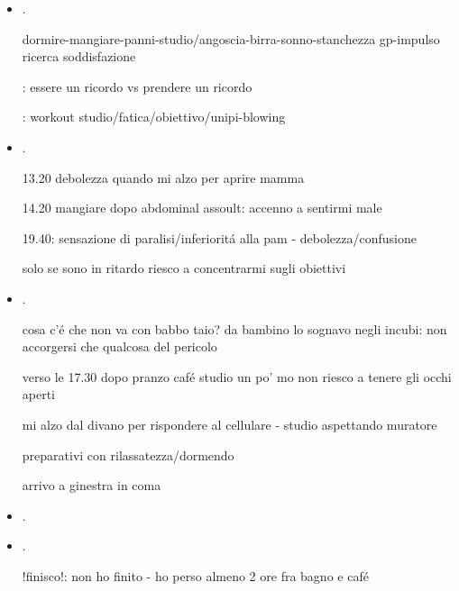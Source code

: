 \begin{itemize}
ansia di non addormentarsi

sono le 10, priorit\'a incosciente

mi manca nitidezza per distingure capitalit\'a da cosa

condizione post pisolino pomeriggio: non riesco a distinguere cosa mi conviene - 

cena: perdo di vista me-impulso non essere riconosciuto

\item {}.

dormire-mangiare-panni-studio/angoscia-birra-sonno-stanchezza gp-impulso ricerca soddisfazione

: essere un ricordo vs prendere un ricordo

: workout studio/fatica/obiettivo/unipi-blowing

\item {}.

13.20 debolezza quando mi alzo per aprire mamma

14.20 mangiare dopo abdominal assoult: accenno a sentirmi male

19.40: sensazione di paralisi/inferiorit\'a alla pam - debolezza/confusione

solo se sono in ritardo riesco a concentrarmi sugli obiettivi

\item {}.

cosa c'\'e che non va con babbo taio? da bambino lo sognavo negli incubi: non accorgersi che qualcosa del pericolo

verso le 17.30 dopo pranzo caf\'e studio un po' mo non riesco a tenere gli occhi aperti

mi alzo dal divano per rispondere al cellulare - studio aspettando muratore

preparativi con rilassatezza/dormendo

arrivo a ginestra in coma

\item {}.

\item {}.

!finisco!: non ho finito - ho perso almeno 2 ore fra bagno e caf\'e


\end{itemize}
